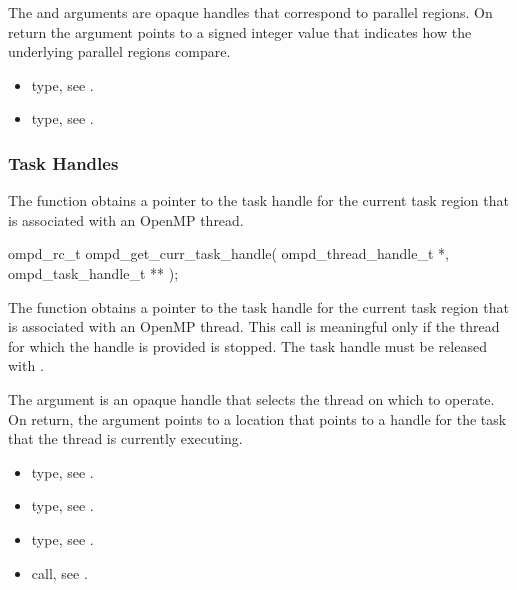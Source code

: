 \argdesc
The  and  arguments are 
opaque handles that correspond to parallel regions. On return the 
argument points to a signed integer value that indicates how the underlying 
parallel regions compare.

\crossreferences
\begin{itemize}
\item {} type, 
see .

\item {} type, see .
\end{itemize}



\subsubsection{Task Handles}



\label{subsubsubsec:ompd_get_curr_task_handle}

\summary
The  function obtains a pointer to the task 
handle for the current task region that is associated with an OpenMP thread.

\format
\begin{cspecific}
\begin{ompSyntax}
ompd_rc_t ompd_get_curr_task_handle(
  ompd_thread_handle_t *,
  ompd_task_handle_t **
);
\end{ompSyntax}
\end{cspecific}

\descr
The  function obtains a pointer to the task 
handle for the current task region that is associated with an OpenMP thread.
This call is meaningful only if the thread for which the handle is provided 
is stopped. The task handle must be released with .

\argdesc
The  argument is an opaque handle that selects the thread 
on which to operate. On return, the  argument points to a 
location that points to a handle for the task that the thread is currently 
executing.

\crossreferences
\begin{itemize}
\item {} type, 
see .

\item {} type, see .

\item {} type, see .

\item {} call, 
see .
\end{itemize}



